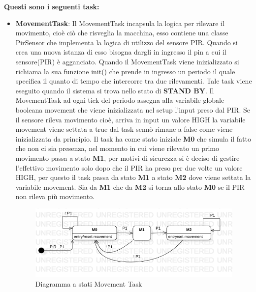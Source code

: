 \documentclass[a4paper]{article}
\begin{document}
\textbf{Questi sono i seguenti task:}
\begin{itemize}

\item \textbf{MovementTask}:
Il MovementTask incapsula la logica per rilevare il movimento, cioè ciò che risveglia la macchina, esso contiene una classe PirSensor che implementa la logica di utilizzo del sensore PIR. Quando si crea una nuova istanza di esso bisogna dargli in ingresso il pin a cui il sensore(PIR) è agganciato. 
Quando il MovementTask viene inizializzato si richiama la sua funzione init() che prende in ingresso un periodo il quale specifica il quanto di tempo che intercorre tra due rilevamenti. 
Tale task viene eseguito quando il sistema si trova nello stato di \textbf{STAND BY}. Il MovementTask ad ogni tick del periodo assegna alla
variabile globale booleana movement che viene inizializzata nel setup l'input preso dal PIR. Se il sensore rileva movimento cioè, arriva in input un valore HIGH la variabile movement viene settata a true dal task sennò rimane a false come viene inizializzata da principio.  
Il task ha come stato iniziale \textbf{M0} che simula il fatto che non ci sia presenza, nel momento in cui viene rilevato un primo movimento passa a stato \textbf{M1}, per motivi di sicurezza si è deciso di gestire l'effettivo movimento solo dopo che il PIR ha preso per due volte un valore HIGH, per questo il task passa da stato \textbf{M1} a stato \textbf{M2} dove viene settata la variabile movement. Sia da  \textbf{M1} che da \textbf{M2} si torna allo stato \textbf{M0} se il PIR non rileva più movimento. 

\begin{figure}[h!]
	\includegraphics[scale = 0.60]{MovementTask.png}
	\caption{Diagramma a stati Movement Task}
\end{figure}

\newpage


\end{itemize}
\end{document}
